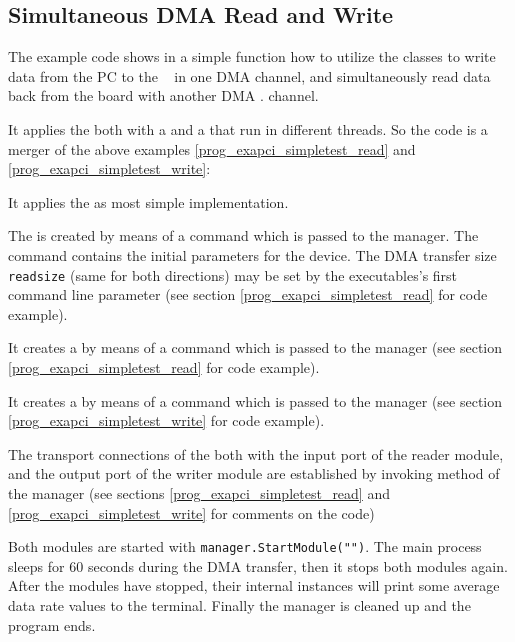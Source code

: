 \subsection{Simultaneous DMA Read and Write}
The example code  shows in a
simple  function how to utilize the
 classes to write data from the PC to the \ABB~ 
in one DMA channel,  and simultaneously read data back from the board with another
DMA . 
channel. 

It applies the  both with
a  and a 
that run in different threads. So the code is a merger of the
above examples \ref{prog_exapci_simpletest_read} and
\ref{prog_exapci_simpletest_write}:

\begin{compactenum} 

\item It applies the  as most simple
 implementation.

\item The  is created by means of a command
 which is passed to the manager. The 
command contains the initial parameters for the device.
The DMA transfer size {\tt readsize} (same for both directions) 
may be set by the executables's first command line parameter
(see section \ref{prog_exapci_simpletest_read} for code example).

\item It creates a  by means of a command
 which is passed to the manager
(see section \ref{prog_exapci_simpletest_read} for code example).

\item It creates a  by means of a command
 which is passed to the manager
(see section \ref{prog_exapci_simpletest_write} for code example).

\item The transport connections of the  both with
the input port of the reader module, and the output port of the writer module 
are established by invoking method  of the manager
(see sections \ref{prog_exapci_simpletest_read} and \ref{prog_exapci_simpletest_write}
for comments on the code)

\item Both modules are started with
{\tt manager.StartModule("")}.
The main process sleeps for 60 seconds during the DMA transfer, then
it stops both modules again.
After the modules have stopped, their internal 
instances will print some average data rate values to the terminal.
Finally the manager is cleaned up and the program ends.

\end{compactenum} 




